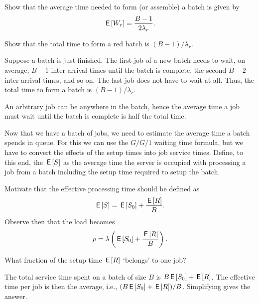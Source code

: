 \begin{exercise}
  Show that the average time needed to form (or assemble) a batch is given by
\begin{equation}\label{eq:79}
 \,\mathsf{E}\left[W_r\right] = \frac{B-1}{2\lambda_r}.
\end{equation}
\begin{hint}
 Show that the total time to form a red batch is $(B-1)/\lambda_r$. 
\end{hint}
\begin{solution}
 Suppose a batch is just finished. The first job of a new batch needs to wait, on average, $B-1$ inter-arrival times until the batch is complete, the second $B-2$ inter-arrival times, and so on. The last job does not have to wait at all. Thus, the total time to form a batch is $(B-1)/\lambda_r$. 

An arbitrary job can be anywhere in the batch, hence the average time a job must wait until the batch is complete is half the total time. 
\end{solution}
\end{exercise}

Now that we have a batch of jobs, we need to estimate the average time a batch spends in queue.
For this we can use the $G/G/1$ waiting time formula, but we have to convert the effects of the setup times into job service times.
Define, to this end, the  $\,\mathsf{E}\left[S\right]$ as the average time the server is occupied with processing a job from a batch including the setup time required to setup the batch.

\begin{exercise}
  Motivate that the effective processing time should be defined as
\begin{equation}\label{eq:81}
 \,\mathsf{E}\left[S\right] = \,\mathsf{E}\left[S_0\right] + \frac{\,\mathsf{E}\left[R\right]} B.
\end{equation}
Observe then that the load becomes
\begin{equation*}
\rho = \lambda \left(\,\mathsf{E}\left[S_0\right] + \frac{\,\mathsf{E}\left[R\right]}B\right).
\end{equation*}
\begin{hint}
 What fraction of the setup time $\,\mathsf{E}\left[R\right]$ `belongs' to one job?
\end{hint}
\begin{solution}
  The total service time spent on a batch of size $B$ is $B \,\mathsf{E}\left[S_0\right] + \,\mathsf{E}\left[R\right]$.
  The effective time per job is then the average, i.e., $(B \,\mathsf{E}\left[S_0\right]+\,\mathsf{E}\left[R\right])/B$.
  Simplifying gives the answer.
\end{solution}
\end{exercise}

